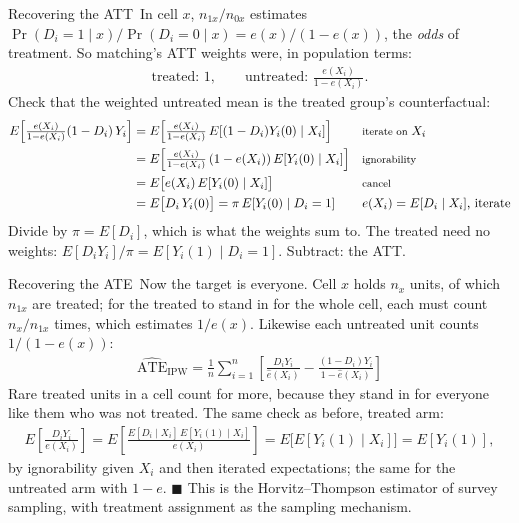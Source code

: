 \documentclass[aspectratio=169,11pt,xcolor=dvipsnames]{beamer}
\newcommand{\E}{E}
\newcommand{\core}{\,\raisebox{0.6pt}{\textcolor{corestar}{$\bigstar$}}}
\begin{document}
\begin{frame}{Recovering the ATT\core}
In cell $x$, $n_{1x}/n_{0x}$ estimates
$\Pr(D_i = 1\mid x)/\Pr(D_i = 0\mid x) = e(x)/(1-e(x))$, the \emph{odds} of
treatment. So matching's ATT weights were, in population terms:
\begin{align*}
  \text{treated: } 1, \qquad \text{untreated: } \frac{e(X_i)}{1-e(X_i)} .
\end{align*}
Check that the weighted untreated mean is the treated group's counterfactual:
{\small
\begin{align*}
  \E\!\left[\tfrac{e(X_i)}{1-e(X_i)}(1-D_i)\,Y_i\right]
  &= \E\!\left[\tfrac{e(X_i)}{1-e(X_i)}\,\E[(1-D_i)Y_i(0)\mid X_i]\right]
  && \text{\footnotesize iterate on } X_i \\
  &= \E\!\left[\tfrac{e(X_i)}{1-e(X_i)}\,(1-e(X_i))\,\E[Y_i(0)\mid X_i]\right]
  && \text{\footnotesize ignorability} \\
  &= \E\big[e(X_i)\,\E[Y_i(0)\mid X_i]\big]
  && \text{\footnotesize cancel} \\
  &= \E\big[D_i\,Y_i(0)\big] = \pi\,\E[Y_i(0)\mid D_i = 1]
  && \text{\footnotesize } e(X_i) = \E[D_i\mid X_i] \text{, iterate}
\end{align*}}
Divide by $\pi = \E[D_i]$, which is what the weights sum to. The treated need
no weights: $\E[D_iY_i]/\pi = \E[Y_i(1)\mid D_i = 1]$. Subtract: the ATT.
\end{frame}

\begin{frame}{Recovering the ATE\core}
Now the target is everyone. Cell $x$ holds $n_x$ units, of which $n_{1x}$ are
treated; for the treated to stand in for the whole cell, each must count
$n_x/n_{1x}$ times, which estimates $1/e(x)$. Likewise each untreated unit
counts $1/(1-e(x))$:
\begin{align*}
  \boxed{\;\widehat{\text{ATE}}_{\text{IPW}}
  = \frac1n\sum_{i=1}^n \left[\frac{D_i Y_i}{\hat e(X_i)}
  - \frac{(1-D_i)Y_i}{1-\hat e(X_i)}\right]\;}
\end{align*}
Rare treated units in a cell count for more, because they stand in for
everyone like them who was not treated. The same check as before, treated arm:
\begin{align*}
  \E\!\left[\frac{D_i Y_i}{e(X_i)}\right]
  = \E\!\left[\frac{\E[D_i\mid X_i]\,\E[Y_i(1)\mid X_i]}{e(X_i)}\right]
  = \E\big[\E[Y_i(1)\mid X_i]\big] = \E[Y_i(1)] ,
\end{align*}
by ignorability given $X_i$ and then iterated expectations; the same for the
untreated arm with $1-e$. $\blacksquare$ This is the
Horvitz--Thompson estimator of survey sampling, with treatment assignment as
the sampling mechanism.
\end{frame}
\end{document}
